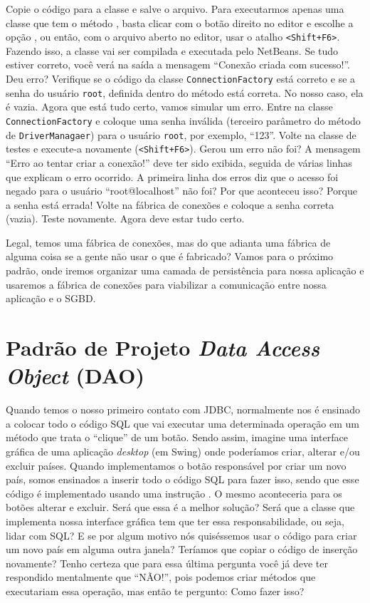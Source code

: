 Copie o código para a classe e salve o arquivo. Para executarmos apenas uma classe que tem o método , basta clicar com o botão direito no editor e escolhe a opção , ou então, com o arquivo aberto no editor, usar o atalho \texttt{<Shift+F6>}. Fazendo isso, a classe vai ser compilada e executada pelo NetBeans. Se tudo estiver correto, você verá na saída a mensagem ``Conexão criada com sucesso!''. Deu erro? Verifique se o código da classe \texttt{ConnectionFactory} está correto e se a senha do usuário \texttt{root}, definida dentro do método  está correta. No nosso caso, ela é vazia. Agora que está tudo certo, vamos simular um erro. Entre na classe \texttt{ConnectionFactory} e coloque uma senha inválida (terceiro parâmetro do método  de \texttt{DriverManagaer}) para o usuário \texttt{root}, por exemplo, ``123''. Volte na classe de testes e execute-a novamente (\texttt{<Shift+F6>}). Gerou um erro não foi? A mensagem ``Erro ao tentar criar a conexão!'' deve ter sido exibida, seguida de várias linhas que explicam o erro ocorrido. A primeira linha dos erros diz que o acesso foi negado para o usuário ``root@localhost'' não foi? Por que aconteceu isso? Porque a senha está errada! Volte na fábrica de conexões e coloque a senha correta (vazia). Teste novamente. Agora deve estar tudo certo.

Legal, temos uma fábrica de conexões, mas do que adianta uma fábrica de alguma coisa se a gente não usar o que é fabricado? Vamos para o próximo padrão, onde iremos organizar uma camada de persistência para nossa aplicação e usaremos a fábrica de conexões para viabilizar a comunicação entre nossa aplicação e o SGBD.


\section{Padrão de Projeto \textit{Data Access Object} (DAO)}

Quando temos o nosso primeiro contato com JDBC, normalmente nos é ensinado a colocar todo o código SQL que vai executar uma determinada operação em um método que trata o ``clique'' de um botão. Sendo assim, imagine uma interface gráfica de uma aplicação \textit{desktop} (em Swing) onde poderíamos criar, alterar e/ou excluir países. Quando implementamos o botão responsável por criar um novo país, somos ensinados a inserir todo o código SQL para fazer isso, sendo que esse código é implementado usando uma instrução . O mesmo aconteceria para os botões alterar e excluir. Será que essa é a melhor solução? Será que a classe que implementa nossa interface gráfica tem que ter essa responsabilidade, ou seja, lidar com SQL? E se por algum motivo nós quiséssemos usar o código para criar um novo país em alguma outra janela? Teríamos que copiar o código de inserção novamente? Tenho certeza que para essa última pergunta você já deve ter respondido mentalmente que ``NÃO!'', pois podemos criar métodos que executariam essa operação, mas então te pergunto: Como fazer isso?

